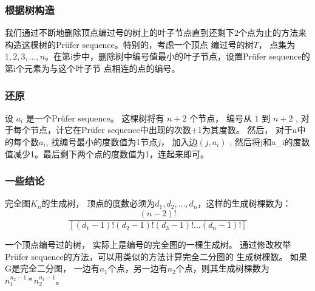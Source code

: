 \subsubsection{根据树构造}
我们通过不断地删除顶点编过号的树上的叶子节点直到还剩下2个点为止的方法来构造这棵树的Prüfer sequence。特别的，考虑一个顶点
编过号的树$T$， 点集为$ { 1, 2, 3, \ldots , n} $。在第i步中，删除树中编号值最小的叶子节点，设置Prüfer sequence的第i个元素为与这个叶子节
点相连的点的编号。

\subsubsection{还原}
设 $a_i$ 是一个Prüfer sequence。
这棵树将有 $n + 2$ 个节点， 编号从 $1$ 到 $n + 2$ , 对于每个节点，计它在Prüfer sequence中出现的次数+1为其度数。
然后， 对于$a$中的每个数$a_i$, 找编号最小的度数值为1节点$j$， 加入边$(j,a_i)$ , 然后将j和a_i的度数值减少1。最后剩下两个点的度数值为1，连起来即可。

\subsubsection{一些结论}
完全图$K_n$的生成树， 顶点的度数必须为$d_1, d_2, \ldots, d_n$，这样的生成树棵数为：
$$ \frac{(n-2)!}{[(d_1 - 1)! (d_2 - 1)! (d_3 - 1)! \ldots (d_n - 1)!]} $$

一个顶点编号过的树， 实际上是编号的完全图的一棵生成树。 通过修改枚举Prüfer sequence的方法，可以用类似的方法计算完全二分图的
生成树棵数。 如果G是完全二分图， 一边有$n_1$个点，另一边有$n_2$个点，则其生成树棵数为 $n_1 ^ {n_2 - 1} * n_2 ^ {n_1 - 1}$。
